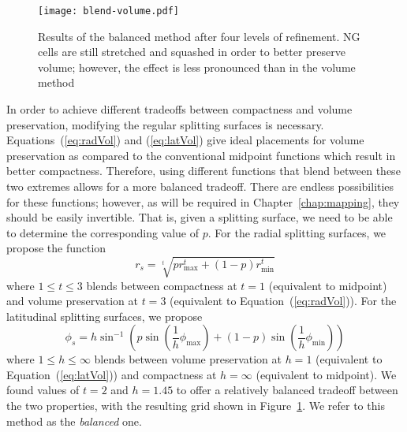 \begin{figure}[ht!]
	\centering
	\texttt{[image: blend-volume.pdf]}
	\caption[Distribution of cell volumes in the balanced modification]{
		Results of the balanced method after four levels of refinement.
		NG cells are still stretched and squashed in order to better preserve volume; however, the effect is less pronounced than in the volume method
	}
	\label{fig:blend-volume}
\end{figure}


In order to achieve different tradeoffs between compactness and volume preservation, modifying the regular splitting surfaces is necessary.
Equations~(\ref{eq:radVol}) and (\ref{eq:latVol}) give ideal placements for volume preservation as compared to the conventional midpoint functions which result in better compactness.
Therefore, using different functions that blend between these two extremes allows for a more balanced tradeoff.
There are endless possibilities for these functions; however, as will be required in Chapter~\ref{chap:mapping}, they should be easily invertible.
That is, given a splitting surface, we need to be able to determine the corresponding value of $p$.
For the radial splitting surfaces, we propose the function
%
\begin{equation*}
r_{s} = \sqrt[t]{ p r_\mathrm{max}^{t} + \left( 1 - p \right) r_\mathrm{min}^{t} }
\end{equation*}
%
where $1 \leq t \leq 3$ blends between compactness at $t = 1$ (equivalent to midpoint) and volume preservation at $t=3$ (equivalent to Equation~(\ref{eq:radVol})).
For the latitudinal splitting surfaces, we propose
%
\begin{equation*}
\phi_{s} = h \sin^{-1} \left( p \sin \left( \frac{1}{h} \phi_\mathrm{max} \right) + \left( 1 - p \right) \sin \left( \frac{1}{h} \phi_\mathrm{min} \right) \right)
\end{equation*}
%
where $1 \leq h \leq \infty$ blends between volume preservation at $h = 1$ (equivalent to Equation~(\ref{eq:latVol})) and compactness at $h = \infty$ (equivalent to midpoint). We found values of $t = 2$ and $h = 1.45$ to offer a relatively balanced tradeoff between the two properties, with the resulting grid shown in Figure~\ref{fig:blend-volume}.
We refer to this method as the \textit{balanced} one.


